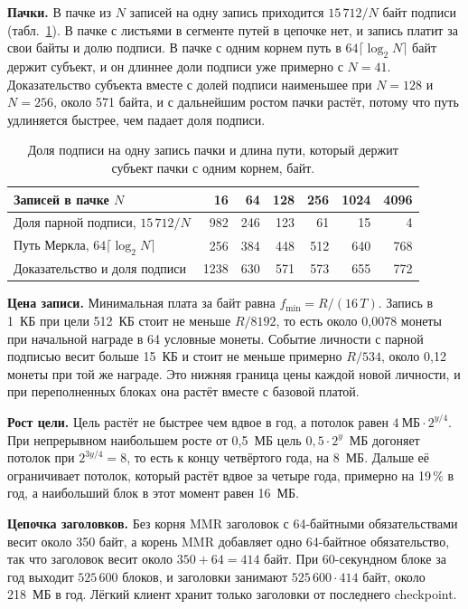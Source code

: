 \documentclass[10pt,a4paper]{article}
\begin{document}
\textbf{Пачки.}
В пачке из $N$ записей на одну запись приходится $15\,712/N$ байт подписи (табл.~\ref{tab:batch}).
В пачке с листьями в сегменте путей в цепочке нет, и запись платит за свои байты и долю подписи.
В пачке с одним корнем путь в $64\lceil\log_2 N\rceil$ байт держит субъект, и он длиннее доли подписи уже примерно с $N=41$.
Доказательство субъекта вместе с долей подписи наименьшее при $N=128$ и $N=256$, около 571 байта, и с дальнейшим ростом пачки растёт, потому что путь удлиняется быстрее, чем падает доля подписи.

\begin{table}[t]
\centering\small
\caption{Доля подписи на одну запись пачки и длина пути, который держит субъект пачки с одним корнем, байт.}
\label{tab:batch}
\footnotesize
\begin{tabular}{lrrrrrr}
\toprule
Записей в пачке $N$ & 16 & 64 & 128 & 256 & 1024 & 4096 \\
\midrule
Доля парной подписи, $15\,712/N$ & 982 & 246 & 123 & 61 & 15 & 4 \\
Путь Меркла, $64\lceil\log_2N\rceil$ & 256 & 384 & 448 & 512 & 640 & 768 \\
Доказательство и доля подписи & 1238 & 630 & 571 & 573 & 655 & 772 \\
\bottomrule
\end{tabular}
\end{table}

\textbf{Цена записи.}
Минимальная плата за байт равна $f_{\min}=R/(16\,T)$.
Запись в 1~КБ при цели 512~КБ стоит не меньше $R/8192$, то есть около 0,0078 монеты при начальной награде в 64 условные монеты.
Событие личности с парной подписью весит больше 15~КБ и стоит не меньше примерно $R/534$, около 0,12 монеты при той же награде.
Это нижняя граница цены каждой новой личности, и при переполненных блоках она растёт вместе с базовой платой.

\textbf{Рост цели.}
Цель растёт не быстрее чем вдвое в год, а потолок равен $4~\text{МБ}\cdot2^{y/4}$.
При непрерывном наибольшем росте от 0,5~МБ цель $0{,}5\cdot2^{y}$~МБ догоняет потолок при $2^{3y/4}=8$, то есть к концу четвёртого года, на 8~МБ.
Дальше её ограничивает потолок, который растёт вдвое за четыре года, примерно на 19\,\% в год, а наибольший блок в этот момент равен 16~МБ.

\textbf{Цепочка заголовков.}
Без корня MMR заголовок с 64-байтными обязательствами весит около 350 байт, а корень MMR добавляет одно 64-байтное обязательство, так что заголовок весит около $350+64=414$ байт.
При 60-секундном блоке за год выходит $525\,600$ блоков, и заголовки занимают $525\,600\cdot414$ байт, около 218~МБ в год.
Лёгкий клиент хранит только заголовки от последнего checkpoint.
\end{document}
